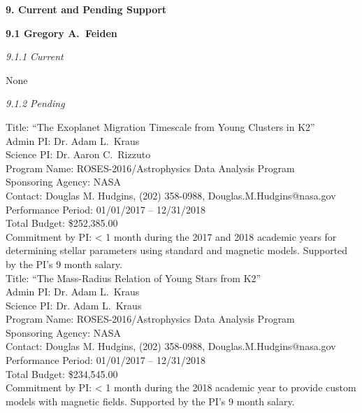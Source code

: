 %
%

{\bf\large 9. Current and Pending Support}  

{\bf 9.1 Gregory A.~Feiden} 

{\it 9.1.1 Current}

None 

{\it 9.1.2 Pending}

Title: ``The Exoplanet Migration Timescale from Young Clusters in K2'' \\
Admin PI: Dr. Adam L.\ Kraus \\
Science PI: Dr. Aaron C.\ Rizzuto \\
Program Name: ROSES-2016/Astrophysics Data Analysis Program \\
Sponsoring Agency: NASA \\
Contact: Douglas M. Hudgins, (202) 358-0988, Douglas.M.Hudgins@nasa.gov \\
Performance Period: 01/01/2017 -- 12/31/2018 \\
Total Budget: \$252,385.00 \\
Commitment by PI: < 1 month during the 2017 and 2018 academic years for determining stellar parameters using standard and magnetic models. Supported by the PI's 9 month salary. \\

Title: ``The Mass-Radius Relation of Young Stars from K2'' \\
Admin PI: Dr. Adam L.\ Kraus \\
Science PI: Dr. Adam L.\ Kraus \\
Program Name: ROSES-2016/Astrophysics Data Analysis Program \\
Sponsoring Agency: NASA \\
Contact: Douglas M. Hudgins, (202) 358-0988, Douglas.M.Hudgins@nasa.gov \\
Performance Period: 01/01/2017 -- 12/31/2018 \\
Total Budget: \$234,545.00 \\
Commitment by PI: < 1 month during the 2018 academic year to provide custom models with magnetic fields. Supported by the PI's 9 month salary. \\